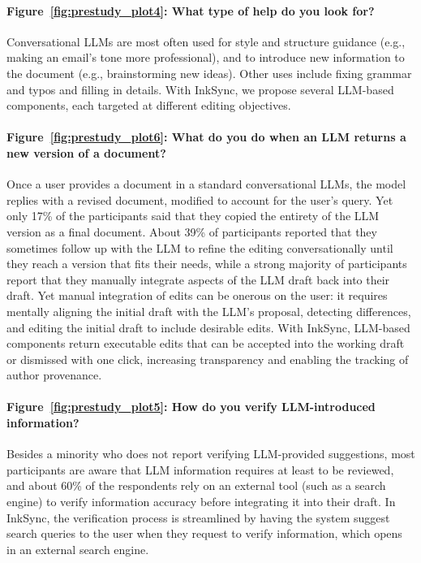 \documentclass[manuscript]{acmart}
\begin{document}
\paragraph{Figure~\ref{fig:prestudy_plot4}: What type of help do you look for?} Conversational LLMs are most often used for style and structure guidance (e.g., making an email's tone more professional), and to introduce new information to the document (e.g., brainstorming new ideas). Other uses include fixing grammar and typos and filling in details. With InkSync, we propose several LLM-based components, each targeted at different editing objectives.

\paragraph{Figure~\ref{fig:prestudy_plot6}: What do you do when an LLM returns a new version of a document?} Once a user provides a document in a standard conversational LLMs, the model replies with a revised document, modified to account for the user's query. Yet only 17\% of the participants said that they copied the entirety of the LLM version as a final document. About 39\% of participants reported that they sometimes follow up with the LLM to refine the editing conversationally until they reach a version that fits their needs, while a strong majority of participants report that they manually integrate aspects of the LLM draft back into their draft. Yet manual integration of edits can be onerous on the user: it requires mentally aligning the initial draft with the LLM's proposal, detecting differences, and editing the initial draft to include desirable edits. With InkSync, LLM-based components return executable edits that can be accepted into the working draft or dismissed with one click, increasing transparency and enabling the tracking of author provenance.

\paragraph{Figure~\ref{fig:prestudy_plot5}: How do you verify LLM-introduced information?} Besides a minority who does not report verifying LLM-provided suggestions, most participants are aware that LLM information requires at least to be reviewed, and about 60\% of the respondents rely on an external tool (such as a search engine) to verify information accuracy before integrating it into their draft. In InkSync, the verification process is streamlined by having the system suggest search queries to the user when they request to verify information, which opens in an external search engine.
\end{document}
